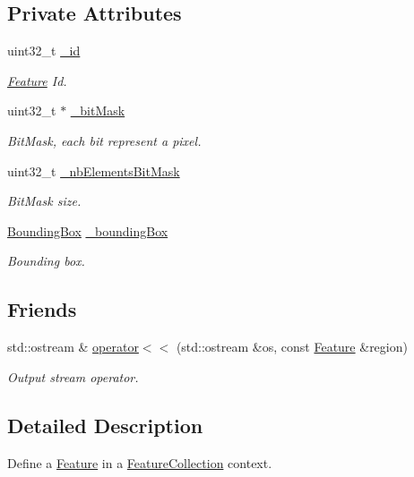 \subsection*{Private Attributes}
\begin{DoxyCompactItemize}
\item 
uint32\+\_\+t \hyperlink{classfc_1_1Feature_aa212a88fec6bc5973c655069d64825fd}{\+\_\+id}
\begin{DoxyCompactList}\small\item\em \hyperlink{classfc_1_1Feature}{Feature} Id. \end{DoxyCompactList}\item 
uint32\+\_\+t $\ast$ \hyperlink{classfc_1_1Feature_acab3e3e0a9d67af174f19ec7f8e3668f}{\+\_\+bit\+Mask}
\begin{DoxyCompactList}\small\item\em Bit\+Mask, each bit represent a pixel. \end{DoxyCompactList}\item 
uint32\+\_\+t \hyperlink{classfc_1_1Feature_abf72f4385cf0552270cc99df0dd6ecdd}{\+\_\+nb\+Elements\+Bit\+Mask}
\begin{DoxyCompactList}\small\item\em Bit\+Mask size. \end{DoxyCompactList}\item 
\hyperlink{classfc_1_1BoundingBox}{Bounding\+Box} \hyperlink{classfc_1_1Feature_ac6bc52c10118373d56c6789dcffc59fa}{\+\_\+bounding\+Box}
\begin{DoxyCompactList}\small\item\em Bounding box. \end{DoxyCompactList}\end{DoxyCompactItemize}
\subsection*{Friends}
\begin{DoxyCompactItemize}
\item 
std\+::ostream \& \hyperlink{classfc_1_1Feature_a87a7af61219690a546906a8d61762dce}{operator$<$$<$} (std\+::ostream \&os, const \hyperlink{classfc_1_1Feature}{Feature} \&region)
\begin{DoxyCompactList}\small\item\em Output stream operator. \end{DoxyCompactList}\end{DoxyCompactItemize}


\subsection{Detailed Description}
Define a \hyperlink{classfc_1_1Feature}{Feature} in a \hyperlink{classfc_1_1FeatureCollection}{Feature\+Collection} context. 

